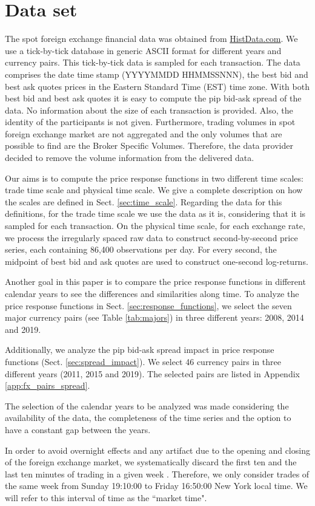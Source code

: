 \section{Data set}\label{sec:data_set}

The spot foreign exchange financial data was obtained from
\href{www.histdata.com}{HistData.com}. We use a tick-by-tick database in
generic ASCII format for different years and currency pairs. This tick-by-tick
data is sampled for each transaction. The data comprises the date time stamp
(YYYYMMDD HHMMSSNNN), the best bid and best ask quotes prices in the Eastern
Standard Time (EST) time zone. With both best bid and best ask quotes it is
easy to compute the pip bid-ask spread of the data. No information about the
size of each transaction is provided. Also, the identity of the participants is
not given. Furthermore, trading volumes in spot foreign exchange market are not
aggregated and the only volumes that are possible to find are the Broker
Specific Volumes. Therefore, the data provider decided to remove the volume
information from the delivered data.

Our aims is to compute the price response functions in two different
time scales: trade time scale and physical time scale. We give a complete
description on how the scales are defined in Sect.  \ref{sec:time_scale}.
Regarding the data for this definitions, for the trade time scale we use the
data as it is, considering that it is sampled for each transaction. On the
physical time scale, for each exchange rate, we process the irregularly spaced
raw data to construct second-by-second price series, each containing 86,400
observations per day. For every second, the midpoint of best bid and ask quotes
are used to construct one-second log-returns.

Another goal in this paper is to compare the price response functions in
different calendar years to see the differences and similarities along time.
To analyze the price response functions in Sect. \ref{sec:response_functions},
we select the seven major currency pairs (see Table \ref{tab:majors}) in three
different years: 2008, 2014 and 2019.

Additionally, we analyze the pip bid-ask spread impact in price response
functions (Sect. \ref{sec:spread_impact}). We select 46 currency pairs in three
different years (2011, 2015 and 2019). The selected pairs are listed in
Appendix \ref{app:fx_pairs_spread}.

The selection of the calendar years to be analyzed was made considering the
availability of the data, the completeness of the time series and the option to
have a constant gap between the years.

In order to avoid overnight effects and any artifact due to the opening and
closing of the foreign exchange market, we systematically discard the first
ten and the last ten minutes of trading in a given week
\cite{Bouchaud_2004,my_paper_response_financial,Wang_2016_cross,large_prices_changes,spread_changes_affect}.
Therefore, we only consider trades of the same week from Sunday 19:10:00 to
Friday 16:50:00 New York local time. We will refer to this interval of time as
the ``market time".
